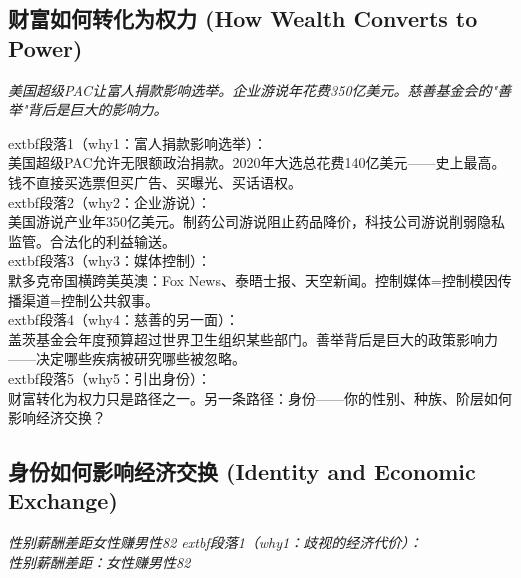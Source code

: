 \documentclass[a4paper,12pt]{book}
\newenvironment{motivation}{\begin{tcolorbox}[colback=gray!10,colframe=gray!60,title=\textit{本章动机},fonttitle=\bfseries,arc=0mm,leftrule=3mm]\small\itshape}{\end{tcolorbox}}
\begin{document}
\begin{motivation}
\begin{motivation}
	\subsection{财富如何转化为权力 (How Wealth Converts to Power)}
	\begin{motivation}美国超级PAC让富人捐款影响选举。企业游说年花费350亿美元。慈善基金会的"善举"背后是巨大的影响力。\end{motivation}
		extbf{段落1（why1：富人捐款影响选举）}：\\美国超级PAC允许无限额政治捐款。2020年大选总花费140亿美元——史上最高。钱不直接买选票但买广告、买曝光、买话语权。\\	extbf{段落2（why2：企业游说）}：\\美国游说产业年350亿美元。制药公司游说阻止药品降价，科技公司游说削弱隐私监管。合法化的利益输送。\\	extbf{段落3（why3：媒体控制）}：\\默多克帝国横跨美英澳：Fox News、泰晤士报、天空新闻。控制媒体=控制模因传播渠道=控制公共叙事。\\	extbf{段落4（why4：慈善的另一面）}：\\盖茨基金会年度预算超过世界卫生组织某些部门。善举背后是巨大的政策影响力——决定哪些疾病被研究哪些被忽略。\\	extbf{段落5（why5：引出身份）}：\\财富转化为权力只是路径之一。另一条路径：身份——你的性别、种族、阶层如何影响经济交换？

	\subsection{身份如何影响经济交换 (Identity and Economic Exchange)}
	\begin{motivation}性别薪酬差距女性赚男性82%
		extbf{段落1（why1：歧视的经济代价）}：\\性别薪酬差距：女性赚男性82%


\end{motivation}
\end{motivation}
\end{motivation}
\end{document}
